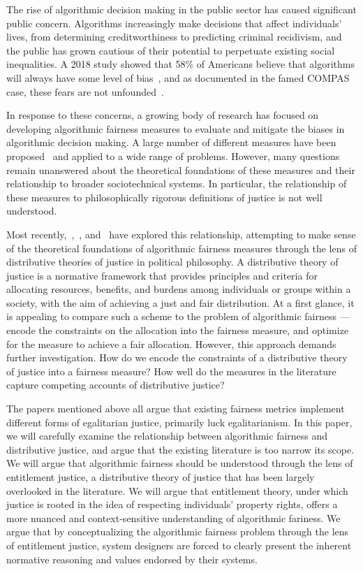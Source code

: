 
The rise of algorithmic decision making in the public sector has caused
significant public concern. Algorithms increasingly make decisions that affect
individuals' lives, from determining creditworthiness to predicting criminal 
recidivism, and the public has grown cautious of their potential to perpetuate 
existing social inequalities. A 2018 study showed that 58\% of Americans
believe that algorithms will always have some level of bias~\cite{Smith_2018}, 
and as documented in the famed COMPAS case, these fears are not
unfounded~\cite{Angwin_2016}.

In response to these concerns, a growing body of research has focused on
developing algorithmic fairness measures to evaluate and mitigate the biases
in algorithmic decision making. A large number of different measures have been
proposed~\cite{CorbettDavies_2023} and applied to a wide range of problems.
However, many questions remain unanswered about the theoretical foundations of
these measures and their relationship to broader sociotechnical systems. In
particular, the relationship of these measures to philosophically rigorous
definitions of justice is not well understood.

Most recently,~\cite{Binns_2018},~\cite{Hertweck_2024}, and~\cite{Kuppler_2021}
have explored this relationship, attempting to make sense of the theoretical
foundations of algorithmic fairness measures through the lens of distributive
theories of justice in political philosophy. A distributive theory of justice is
a normative framework that provides principles and criteria for allocating
resources, benefits, and burdens among individuals or groups within a society,
with the aim of achieving a just and fair distribution. At a first glance, it
is appealing to compare such a scheme to the problem of algorithmic fairness —
encode the constraints on the allocation into the fairness measure, and
optimize for the measure to achieve a fair allocation. However, this approach
demands further investigation. How do we encode the constraints of a
distributive theory of justice into a fairness measure? How well do the measures
in the literature capture competing accounts of distributive justice?

The papers mentioned above all argue that existing fairness metrics implement
different forms of egalitarian justice, primarily luck egalitarianism. In this
paper, we will carefully examine the relationship between algorithmic fairness
and distributive justice, and argue that the existing literature is too narrow
its scope. We will argue that algorithmic fairness should be understood through
the lens of entitlement justice, a distributive theory of justice that has been
largely overlooked in the literature. We will argue that entitlement theory,
under which justice is rooted in the idea of respecting individuals'
property rights, offers a more nuanced and context-sensitive understanding of
algorithmic fariness. We argue that by conceptualizing the algorithmic fairness
problem through the lens of entitlement justice, system designers are forced to
clearly present the inherent normative reasoning and values endorsed by their
systems.

